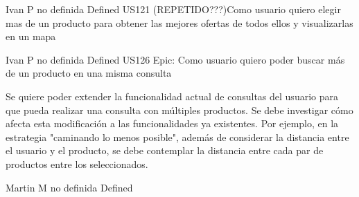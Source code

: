 	{} %
	{} %
	{Ivan P} %
	{no definida} %
	{Defined} %
\userStory
	{US121} %
	{(REPETIDO???)Como usuario quiero elegir mas de un producto para obtener las mejores ofertas de todos ellos y visualizarlas en un mapa} %
	{

} %
	{} %
	{} %
	{Ivan P} %
	{no definida} %
	{Defined} %
\userStory
	{US126} %
	{Epic: Como usuario quiero poder buscar más de un producto en una misma consulta} %
	{Se quiere poder extender la funcionalidad actual de consultas del usuario para
que pueda realizar una consulta con múltiples productos. Se debe investigar
cómo afecta esta modificación a las funcionalidades ya existentes. Por
ejemplo, en la estrategia "caminando lo menos posible", además de considerar
la distancia entre el usuario y el producto, se debe contemplar la distancia
entre cada par de productos entre los seleccionados.

} %
	{} %
	{} %
	{Martin M} %
	{no definida} %
	{Defined} %
